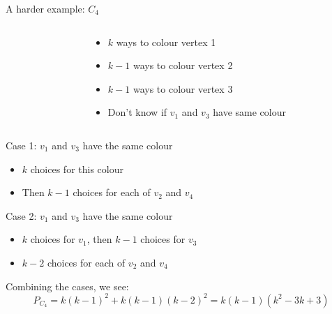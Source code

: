 \documentclass{beamer}
\begin{document}
\begin{frame}{A harder example: $C_4$}
\begin{columns}
  \begin{column}{.2\textwidth}
        \end{column} 

  \begin{column}{.7\textwidth}
        \begin{itemize}
        \item $k$ ways to colour vertex 1
        \item $k-1$ ways to colour vertex 2
        \item $k-1$ ways to colour vertex 3
        \item Don't know if $v_1$ and $v_3$ have same colour 
      \end{itemize}
\end{column}
    \end{columns}

  \begin{block}{Case 1: $v_1$ and $v_3$ have the same colour}
    \begin{itemize}
    \item $k$ choices for this colour
    \item Then $k-1$ choices for each of $v_2$ and $v_4$
    \end{itemize}
    \end{block}
  \begin{block}{Case 2: $v_1$ and $v_3$ have the same colour}
    \begin{itemize}
    \item $k$ choices for $v_1$, then $k-1$ choices for $v_3$
    \item $k-2$ choices for each of $v_2$ and $v_4$
    \end{itemize}
    \end{block}
Combining the cases, we see:
  $$P_{C_4}=k(k-1)^2+k(k-1)(k-2)^2=k(k-1)(k^2-3k+3)$$  
         \end{frame}
\end{document}
